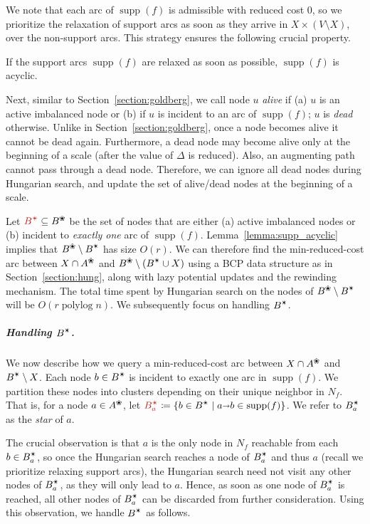 \documentclass[a4paper,UKenglish,nolineno]{socg-lipics-v2019}
\makeatletter
\def\polylog{\mathop{\mathrm{polylog}}}
\def\arcto{\mathord\shortrightarrow}
\def\arc#1#2{#1\arcto#2}
\def\supp{\operatorname{supp}}
\def\alive#1{{#1}^\text{\ding{96}}}
\def\star{\text{\ding{84}}}
\def\EMPH#1{\textcolor{BrickRed}{{\emph{#1}}}}
\def\n@te#1{\textsf{\boldmath \textbf{$\langle\!\langle$#1$\rangle\!\rangle$}}\leavevmode}
\def\note#1{\textcolor{red}{\n@te{#1}}}
\makeatother
\begin{document}
We note that each arc of $\supp(f)$ is admissible with reduced cost $0$,
so we prioritize the relaxation of support arcs as soon as they arrive in
$X \times (V \setminus X)$, over the non-support arcs.
This strategy ensures the following crucial property.

\begin{lemma}
\label{lemma:supp_acyclic}
If the support arcs $\supp(f)$ are relaxed as soon as possible, $\supp(f)$ is acyclic.
\end{lemma}

Next, similar to Section~\ref{section:goldberg}, we call node $u$
\EMPH{alive} if (a) $u$ is an active imbalanced node or (b) if $u$ is incident to
an arc of $\supp(f)$; $u$ is \EMPH{dead} otherwise.
Unlike in Section~\ref{section:goldberg}, once a node becomes alive it cannot
be dead again.
Furthermore, a dead node may become alive only at the beginning of a scale
(after the value of $\Delta$ is reduced).
Also, an augmenting path cannot pass through a dead node.
Therefore, we can ignore all dead nodes during Hungarian search,
and update the set of alive/dead nodes at the beginning of a scale.

Let $\EMPH{$B^\star$} \subseteq \alive{B}$ be the set of nodes that are either (a) active
imbalanced nodes or (b) incident to \emph{exactly one} arc of $\supp(f)$.
Lemma~\ref{lemma:supp_acyclic} implies that $\alive{B} \setminus B^\star$ has size $O(r)$.
%
We can therefore find the min-reduced-cost arc between $X \cap \alive{A}$ and $\alive{B} \setminus (B^\star \cup X)$
using a BCP data structure as in Section~\ref{section:hung}, along with lazy
potential updates and the rewinding mechanism.
The total time spent by Hungarian search on the nodes of $\alive{B} \setminus B^\star$ will be $O(r\polylog n)$.
We subsequently focus on handling $B^\star$.

\subparagraph{Handling $B^\star$.}
We now describe how we query a min-reduced-cost arc between $X \cap \alive{A}$
and $B^\star \setminus X$.
Each node $b \in B^\star$ is incident to exactly one arc in
$\supp(f)$.
We partition these nodes into clusters depending on their unique neighbor in $N_f$.
That is, for a node $a \in \alive{A}$,
let $\EMPH{$B_a^\star$} \coloneqq \{b \in B^\star \mid {\arc ab} \in \supp(f)\}$.
We refer to $B_a^\star$ as the \EMPH{star} of $a$.

The crucial observation is that $a$ is the only node in $N_f$ reachable from
each $b \in B_a^\star$, so once the Hungarian search reaches a node of $B_a^\star$ and thus
$a$ (recall we prioritize relaxing support arcs), the Hungarian search need
not visit any other nodes of $B_a^\star$, as they will only lead to $a$.
Hence, as soon as one node of $B_a^\star$ is reached, all other nodes of $B_a^\star$ can be
discarded from further consideration.
Using this observation, we handle $B^\star$ as follows.
\end{document}
